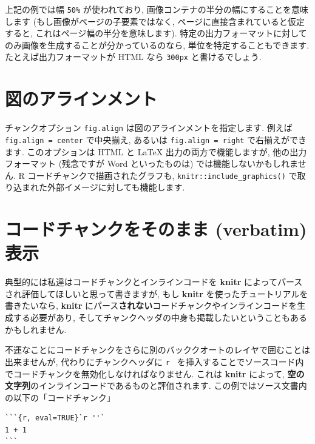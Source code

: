 \documentclass[
  11pt,
]{bxjsreport}
\begin{document}
上記の例では幅 \texttt{50\%} が使われており, 画像コンテナの半分の幅にすることを意味します (もし画像がページの子要素ではなく, ページに直接含まれていると仮定すると, これはページ幅の半分を意味します). 特定の出力フォーマットに対してのみ画像を生成することが分かっているのなら, 単位を特定することもできます. たとえば出力フォーマットが HTML なら \texttt{300px} と書けるでしょう.

\hypertarget{fig-align}{%
\section{図のアラインメント}\label{fig-align}}

チャンクオプション \texttt{fig.align} は図のアラインメントを指定します. 例えば \texttt{fig.align = \textquotesingle{}center\textquotesingle{}} で中央揃え, あるいは \texttt{fig.align = \textquotesingle{}right\textquotesingle{}} で右揃えができます. このオプションは HTML と LaTeX 出力の両方で機能しますが, 他の出力フォーマット (残念ですが Word といったものは) では機能しないかもしれません. R コードチャンクで描画されたグラフも, \texttt{knitr::include\_graphics()} で取り込まれた外部イメージに対しても機能します.

\hypertarget{verbatim-code-chunks}{%
\section{コードチャンクをそのまま (verbatim) 表示}\label{verbatim-code-chunks}}

典型的には私達はコードチャンクとインラインコードを \textbf{knitr} によってパースされ評価してほしいと思って書きますが, もし \textbf{knitr} を使ったチュートリアルを書きたいなら, \textbf{knitr} にパース\textbf{されない}コードチャンクやインラインコードを生成する必要があり, そしてチャンクヘッダの中身も掲載したいということもあるかもしれません.

不運なことにコードチャンクをさらに別のバッククオートのレイヤで囲むことは出来ませんが, 代わりにチャンクヘッダに \texttt{\textasciigrave{}r\ \textquotesingle{}\textquotesingle{}\textasciigrave{}} を挿入することでソースコード内でコードチャンクを無効化しなければなりません. これは \textbf{knitr} によって, \textbf{空の文字列}のインラインコードであるものと評価されます. この例ではソース文書内の以下の「コードチャンク」

\begin{verbatim}
```{r, eval=TRUE}`r ''`
1 + 1
```
\end{verbatim}
\end{document}
